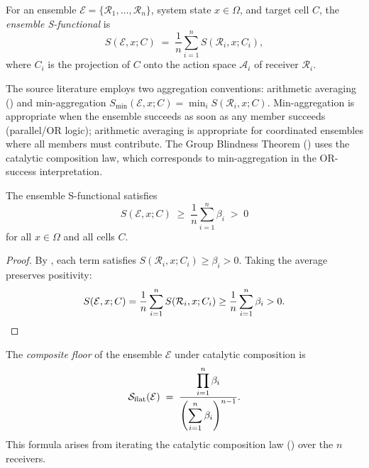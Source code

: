 \begin{definition}
\label{def:multi-agent-s}
For an ensemble $\mathcal{E} = \{\mathcal{R}_1, \ldots, \mathcal{R}_n\}$,
system state $x \in \Omega$, and target cell $C$, the
\emph{ensemble S-functional} is
\[
  S(\mathcal{E}, x; C) \;=\; \frac{1}{n} \sum_{i=1}^{n} S(\mathcal{R}_i, x; C_i) ,
\]
where $C_i$ is the projection of $C$ onto the action space $\mathcal{A}_i$
of receiver $\mathcal{R}_i$.
\end{definition}

\begin{remark}
\label{rem:aggregation}
The source literature employs two aggregation conventions: arithmetic averaging
() and min-aggregation
$S_{\min}(\mathcal{E}, x; C) = \min_i S(\mathcal{R}_i, x; C)$.
Min-aggregation is appropriate when the ensemble succeeds as soon as any
member succeeds (parallel/OR logic); arithmetic averaging is appropriate for
coordinated ensembles where all members must contribute.  The Group Blindness
Theorem () uses the catalytic composition law, which
corresponds to min-aggregation in the OR-success interpretation.
\end{remark}

\begin{proposition}
\label{prop:ensemble-floor-lb}
The ensemble S-functional satisfies
\[
  S(\mathcal{E}, x; C) \;\geq\; \frac{1}{n} \sum_{i=1}^n \beta_i \;>\; 0
\]
for all $x \in \Omega$ and all cells $C$.
\end{proposition}

\begin{proof}
By , each term satisfies $S(\mathcal{R}_i, x; C_i)
\geq \beta_i > 0$.  Taking the average preserves positivity:
\[
  S(\mathcal{E}, x; C) = \frac{1}{n}\sum_{i=1}^n S(\mathcal{R}_i, x; C_i)
  \geq \frac{1}{n}\sum_{i=1}^n \beta_i > 0 . \qedhere
\]
\end{proof}

\begin{definition}
\label{def:composite-floor}
\label{thm:catalytic-composition}
The \emph{composite floor} of the ensemble $\mathcal{E}$ under catalytic
composition is
\[
  \mathcal{S}_{\mathrm{flat}}(\mathcal{E})
  \;=\; \frac{\displaystyle\prod_{i=1}^{n} \beta_i}
             {\displaystyle\left(\sum_{i=1}^{n} \beta_i\right)^{n-1}} .
\]
This formula arises from iterating the catalytic composition law
() over the $n$ receivers.
\end{definition}

